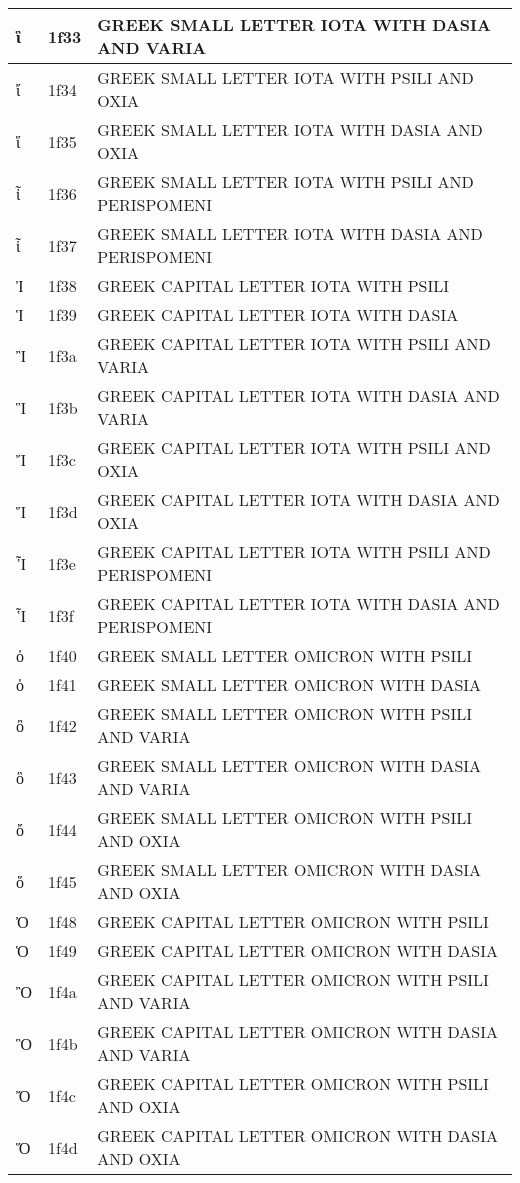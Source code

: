 \documentclass[12pt,letterpaper,openany]{book}
\begin{document}
\begin{center}
\begin{supertabular}{|m{0.25in}|m{0.5in}|m{4in}|}
			ἳ & 1f33 & GREEK SMALL LETTER IOTA WITH DASIA AND VARIA\\\hline
			ἴ & 1f34 & GREEK SMALL LETTER IOTA WITH PSILI AND OXIA\\\hline
			ἵ & 1f35 & GREEK SMALL LETTER IOTA WITH DASIA AND OXIA\\\hline
			ἶ & 1f36 & GREEK SMALL LETTER IOTA WITH PSILI AND PERISPOMENI\\\hline
			ἷ & 1f37 & GREEK SMALL LETTER IOTA WITH DASIA AND PERISPOMENI\\\hline
			Ἰ & 1f38 & GREEK CAPITAL LETTER IOTA WITH PSILI\\\hline
			Ἱ & 1f39 & GREEK CAPITAL LETTER IOTA WITH DASIA\\\hline
			Ἲ & 1f3a & GREEK CAPITAL LETTER IOTA WITH PSILI AND VARIA\\\hline
			Ἳ & 1f3b & GREEK CAPITAL LETTER IOTA WITH DASIA AND VARIA\\\hline
			Ἴ & 1f3c & GREEK CAPITAL LETTER IOTA WITH PSILI AND OXIA\\\hline
			Ἵ & 1f3d & GREEK CAPITAL LETTER IOTA WITH DASIA AND OXIA\\\hline
			Ἶ & 1f3e & GREEK CAPITAL LETTER IOTA WITH PSILI AND PERISPOMENI\\\hline
			Ἷ & 1f3f & GREEK CAPITAL LETTER IOTA WITH DASIA AND PERISPOMENI\\\hline
			ὀ & 1f40 & GREEK SMALL LETTER OMICRON WITH PSILI\\\hline
			ὁ & 1f41 & GREEK SMALL LETTER OMICRON WITH DASIA\\\hline
			ὂ & 1f42 & GREEK SMALL LETTER OMICRON WITH PSILI AND VARIA\\\hline
			ὃ & 1f43 & GREEK SMALL LETTER OMICRON WITH DASIA AND VARIA\\\hline
			ὄ & 1f44 & GREEK SMALL LETTER OMICRON WITH PSILI AND OXIA\\\hline
			ὅ & 1f45 & GREEK SMALL LETTER OMICRON WITH DASIA AND OXIA\\\hline
			Ὀ & 1f48 & GREEK CAPITAL LETTER OMICRON WITH PSILI\\\hline
			Ὁ & 1f49 & GREEK CAPITAL LETTER OMICRON WITH DASIA\\\hline
			Ὂ & 1f4a & GREEK CAPITAL LETTER OMICRON WITH PSILI AND VARIA\\\hline
			Ὃ & 1f4b & GREEK CAPITAL LETTER OMICRON WITH DASIA AND VARIA\\\hline
			Ὄ & 1f4c & GREEK CAPITAL LETTER OMICRON WITH PSILI AND OXIA\\\hline
			Ὅ & 1f4d & GREEK CAPITAL LETTER OMICRON WITH DASIA AND OXIA\\\hline

\end{supertabular}
\end{center}
\end{document}
